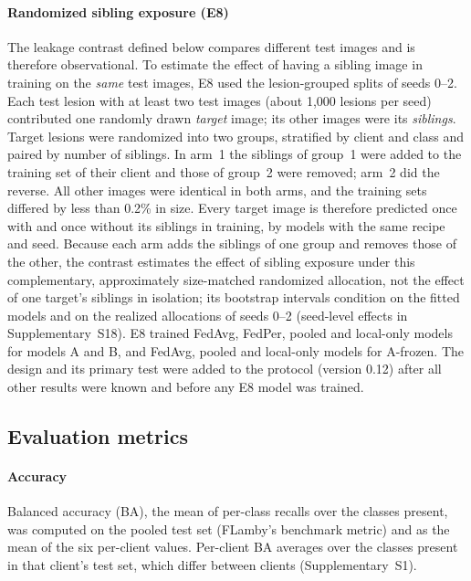 \documentclass[VANCOUVER,Times1COL]{WileyNJDv5}
\begin{document}
\paragraph{Randomized sibling exposure (E8)} The leakage contrast defined below compares different test
images and is therefore observational. To estimate the effect of having a sibling image in training on
the \emph{same} test images, E8 used the lesion-grouped splits of seeds 0--2. Each test lesion with at
least two test images (about 1,000 lesions per seed) contributed one randomly drawn \emph{target} image;
its other images were its \emph{siblings}. Target lesions were randomized into two groups, stratified by
client and class and paired by number of siblings. In arm~1 the siblings of group~1 were added to the
training set of their client and those of group~2 were removed; arm~2 did the reverse. All other images
were identical in both arms, and the training sets differed by less than 0.2\% in size. Every target image
is therefore predicted once with and once without its siblings in training, by models with the same recipe and seed. Because each arm adds the siblings of one group and removes those of the other, the contrast estimates the effect of sibling exposure under this complementary, approximately size-matched randomized allocation, not the effect of one target's siblings in isolation; its bootstrap intervals condition on the fitted models and on the realized allocations of seeds 0--2 (seed-level effects in Supplementary~S18). E8 trained FedAvg, FedPer, pooled and local-only models for models A and B, and FedAvg,
pooled and local-only models for A-frozen. The design and its primary test were added to the protocol
(version 0.12) after all other results were known and before any E8 model was trained.

\subsection{Evaluation metrics}
\label{sec:metrics}

\paragraph{Accuracy} Balanced accuracy (BA), the mean of per-class recalls over the classes present, was
computed on the pooled test set (FLamby's benchmark metric) and as the mean of the six per-client values.
Per-client BA averages over the classes present in that client's test set, which differ between clients
(Supplementary~S1).
\end{document}

